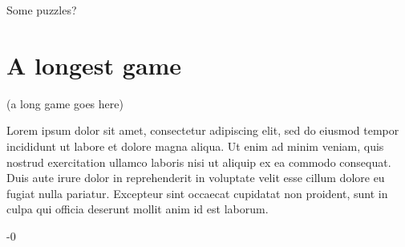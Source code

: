 \documentclass[twocolumn]{article}
\begin{document}
Some puzzles?



\section{A longest game}

\begin{sloppypar}
\tiny
{}


(a long game goes here)

Lorem ipsum dolor sit amet, consectetur adipiscing elit, sed do
eiusmod tempor incididunt ut labore et dolore magna aliqua. Ut enim ad
minim veniam, quis nostrud exercitation ullamco laboris nisi ut
aliquip ex ea commodo consequat. Duis aute irure dolor in
reprehenderit in voluptate velit esse cillum dolore eu fugiat nulla
pariatur. Excepteur sint occaecat cupidatat non proident, sunt in
culpa qui officia deserunt mollit anim id est laborum.

 \noindent 
{}-0

\end{sloppypar}

\nocite{chesstego}

{}

\end{document}
